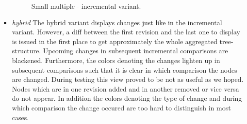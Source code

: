 \begin{itemize}
\begin{figure}[tb]
\caption{\label{fig:smallmultiple-incremental} Small multiple - incremental variant.}
\end{figure}

\item \emph{hybrid} The hybrid variant displays changes just like in the incremental variant. However, a diff between the first revision and the last one to display is issued in the first place to get approximately the whole aggregated tree-structure. Upcoming changes in subsequent incremental comparisons are blackened. Furthermore, the colors denoting the changes lighten up in subsequent comparisons such that it is clear in which comparison the nodes are changed. During testing this view proved to be not as useful as we hoped. Nodes which are in one revision added and in another removed or vice versa do not appear. In addition the colors denoting the type of change and during which comparison the change occured are too hard to distinguish in most cases.


\end{itemize}
